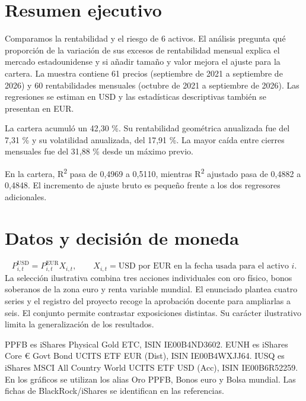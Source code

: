 \documentclass[11pt,a4paper]{article}
\begin{document}
\section{Resumen ejecutivo}
Comparamos la rentabilidad y el riesgo de 6 activos. El análisis pregunta qué proporción de la variación de sus excesos de rentabilidad mensual explica el mercado estadounidense y si añadir tamaño y valor mejora el ajuste para la cartera. La muestra contiene 61 precios (septiembre de 2021 a septiembre de 2026) y 60 rentabilidades mensuales (octubre de 2021 a septiembre de 2026). Las regresiones se estiman en USD y las estadísticas descriptivas también se presentan en EUR.

La cartera acumuló un 42,30 \%. Su rentabilidad geométrica anualizada fue del 7,31 \% y su volatilidad anualizada, del 17,91 \%. La mayor caída entre cierres mensuales fue del 31,88 \% desde un máximo previo.

En la cartera, R\textsuperscript{2} pasa de 0,4969 a 0,5110, mientras R\textsuperscript{2} ajustado pasa de 0,4882 a 0,4848. El incremento de ajuste bruto es pequeño frente a los dos regresores adicionales.

\section{Datos y decisión de moneda}
\begin{equation*}
P^{\mathrm{USD}}_{i,t}=P^{\mathrm{EUR}}_{i,t}X_{i,t},\qquad X_{i,t}=\text{USD por EUR en la fecha usada para el activo }i.
\end{equation*}
La selección ilustrativa combina tres acciones individuales con oro físico, bonos soberanos de la zona euro y renta variable mundial. El enunciado plantea cuatro series y el registro del proyecto recoge la aprobación docente para ampliarlas a seis. El conjunto permite contrastar exposiciones distintas. Su carácter ilustrativo limita la generalización de los resultados.

PPFB es iShares Physical Gold ETC, ISIN IE00B4ND3602. EUNH es iShares Core € Govt Bond UCITS ETF EUR (Dist), ISIN IE00B4WXJJ64. IUSQ es iShares MSCI All Country World UCITS ETF USD (Acc), ISIN IE00B6R52259. En los gráficos se utilizan los alias Oro PPFB, Bonos euro y Bolsa mundial. Las fichas de BlackRock/iShares se identifican en las referencias.
\end{document}
